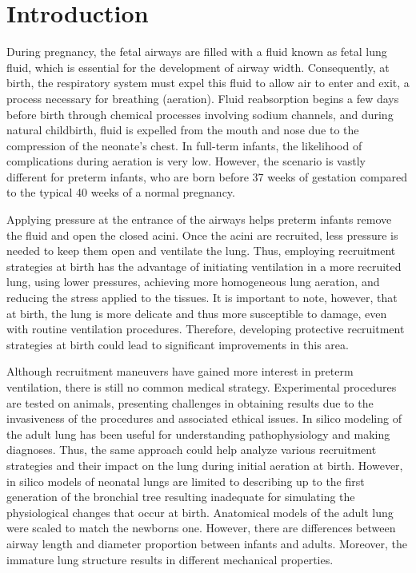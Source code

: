 \section{Introduction}
\label{sec:introduction}

During pregnancy, the fetal airways are filled with a fluid known as
fetal lung fluid, which is essential for the development of airway
width. Consequently, at birth, the respiratory system must expel this
fluid to allow air to enter and exit, a process necessary for
breathing (aeration). Fluid reabsorption begins a few days before
birth through chemical processes involving sodium channels, and during
natural childbirth, fluid is expelled from the mouth and nose due to
the compression of the neonate's chest. In full-term infants, the
likelihood of complications during aeration is very low. However, the
scenario is vastly different for preterm infants, who are born before
37 weeks of gestation compared to the typical 40 weeks of a normal
pregnancy.

Applying pressure at the entrance of the airways helps preterm infants
remove the fluid and open the closed acini. Once the acini are
recruited, less pressure is needed to keep them open and ventilate the
lung. Thus, employing recruitment strategies at birth has the
advantage of initiating ventilation in a more recruited lung, using
lower pressures, achieving more homogeneous lung aeration, and
reducing the stress applied to the tissues. It is important to note,
however, that at birth, the lung is more delicate and thus more
susceptible to damage, even with routine ventilation
procedures. Therefore, developing protective recruitment strategies at
birth could lead to significant improvements in this area.

Although recruitment maneuvers have gained more interest in preterm
ventilation, there is still no common medical strategy. Experimental
procedures are tested on animals, presenting challenges in obtaining
results due to the invasiveness of the procedures and associated
ethical issues\cite{al-jumaily2011, herrmann2016}. In silico modeling
of the adult lung has been useful for understanding pathophysiology
and making diagnoses. Thus, the same approach could help analyze
various recruitment strategies and their impact on the lung during
initial aeration at birth. However, in silico models of neonatal lungs
are limited to describing up to the first generation of the bronchial
tree resulting inadequate for simulating the physiological changes
that occur at birth.  Anatomical models of the adult lung were scaled
to match the newborns one. However, there are differences between
airway length and diameter proportion between infants and
adults\cite{horsfield1987}. Moreover, the immature lung structure
results in different mechanical properties\cite{merkus1996}.


